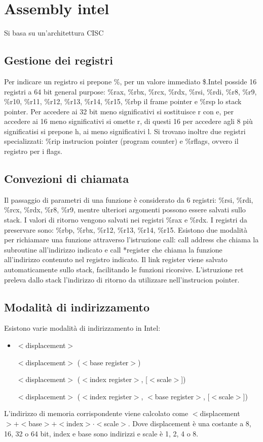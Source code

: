 \chapter{Assembly intel}
Si basa su un'architettura CISC
\section{Gestione dei registri}
Per indicare un registro si prepone \%, per un valore immediato \$.Intel posside 16 registri a 64 bit general purpose: \%rax, \%rbx, \%rcx, \%rdx, \%rsi, \%rdi, \%r8, 
\%r9, \%r10, \%r11, \%r12, \%r13, \%r14, \%r15, \%rbp il frame pointer e \%rsp lo stack pointer. Per accedere ai 32 bit meno significativi si sostituisce r con e, per 
accedere ai 16 meno significativi si omette r, di questi 16 per accedere agli 8 pi\`u significatisi si prepone h, ai meno significativi l. Si trovano inoltre due registri 
specializzati: \%rip instrucion pointer (program counter) e \%rflags, ovvero il registro per i flags. 
\section{Convezioni di chiamata}
Il passaggio di parametri di una funzione \`e considerato da 6 registri: \%rsi, \%rdi, \%rcx, \%rdx, \%r8, \%r9, mentre ulteriori argomenti possono essere salvati sullo
stack. I valori di ritorno vengono salvati nei registri \%rax e \%rdx. I registri da preservare sono: \%rbp, \%rbx, \%r12, \%r13, \%r14, \%r15. Esistono due modalit\`a
per richiamare una funzione attraverso l'istruzione call: call address che chiama la subroutine all'indirizzo indicato e call *register che chiama la funzione 
all'indirizzo contenuto nel registro indicato. Il link register viene salvato automaticamente sullo stack, facilitando le funzioni ricorsive. L'istruzione ret preleva
dallo stack l'indirizzo di ritorno da utilizzare nell'instrucion pointer. 
\section{Modalit\`a di indirizzamento}
Esistono varie modalit\`a di indirizzamento in Intel:
\begin{itemize}
\item $<$displacement$>$
\item [$<$displacement$>$]($<$base register$>$)
\item [$<$displacement$>$]($<$index register$>$, [$<$scale$>$])
\item [$<$displacement$>$]($<$index register$>$, $<$base register$>$, [$<$scale$>$])
\end{itemize}
L'indirizzo di memoria corrispondente viene calcolato come $<$displacement$>+<$base$>+<$index$>\cdot<$scale$>$. Dove displacement \`e una costante a 8, 16, 32 o 64 bit, 
index e base sono indirizzi e scale \`e 1, 2, 4 o 8.
